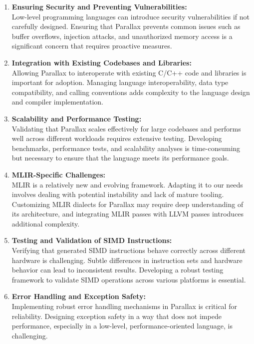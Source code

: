 \documentclass[12pt,a4paper]{article}
\begin{document}
\begin{enumerate}
    \item \textbf{Ensuring Security and Preventing Vulnerabilities:} \\
    Low-level programming languages can introduce security vulnerabilities if not carefully designed. Ensuring that Parallax prevents common issues such as buffer overflows, injection attacks, and unauthorized memory access is a significant concern that requires proactive measures.

    \item \textbf{Integration with Existing Codebases and Libraries:} \\
    Allowing Parallax to interoperate with existing C/C++ code and libraries is important for adoption. Managing language interoperability, data type compatibility, and calling conventions adds complexity to the language design and compiler implementation.

    \item \textbf{Scalability and Performance Testing:} \\
    Validating that Parallax scales effectively for large codebases and performs well across different workloads requires extensive testing. Developing benchmarks, performance tests, and scalability analyses is time-consuming but necessary to ensure that the language meets its performance goals.


    \item \textbf{MLIR-Specific Challenges:} \\
    MLIR is a relatively new and evolving framework. Adapting it to our needs involves dealing with potential instability and lack of mature tooling. Customizing MLIR dialects for Parallax may require deep understanding of its architecture, and integrating MLIR passes with LLVM passes introduces additional complexity.

    \item \textbf{Testing and Validation of SIMD Instructions:} \\
    Verifying that generated SIMD instructions behave correctly across different hardware is challenging. Subtle differences in instruction sets and hardware behavior can lead to inconsistent results. Developing a robust testing framework to validate SIMD operations across various platforms is essential.

    \item \textbf{Error Handling and Exception Safety:} \\
    Implementing robust error handling mechanisms in Parallax is critical for reliability. Designing exception safety in a way that does not impede performance, especially in a low-level, performance-oriented language, is challenging.


\end{enumerate}
\end{document}
